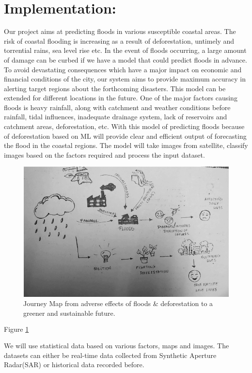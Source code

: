 \documentclass{article}
\begin{document}
	\section*{Implementation:}
		Our project aims at predicting floods in various susceptible coastal areas. The risk of coastal flooding is increasing as a result of deforestation, untimely and torrential rains, sea level rise etc. In the event of floods occurring, a large amount of damage can be curbed if we have a model that could predict floods in advance. To avoid devastating consequences which have a major impact on economic and financial conditions of the city, our system aims to provide maximum accuracy in alerting target regions about the forthcoming disasters. This model can be extended for different locations in the future.
One of the major factors causing floods is heavy rainfall, along with catchment and weather conditions before rainfall, tidal influences, inadequate drainage system, lack of reservoirs and catchment areas, deforestation, etc. With this model of predicting floods because of deforestation based on ML will provide clear and efficient output of forecasting the flood in the coastal regions. The model will take images from satellite, classify images based on the factors required and process the input dataset.

\begin{figure}
	\includegraphics[width=\linewidth]{journeymap.png}
	\caption{Journey Map from adverse effects of floods \& deforestation to a greener and sustainable future.}
	\label{fig:map}
\end{figure}

Figure \ref{fig:map}

We will use statistical data based on various factors, maps and images. The datasets can either be real-time data collected from Synthetic Aperture Radar(SAR) or historical data recorded before.   
\end{document}
